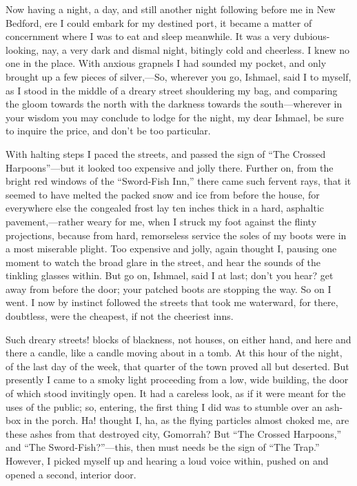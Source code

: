 \documentclass[12pt,ebook,oneside,openany]{memoir} %
\begin{document}
Now having a night, a day, and still another night following before me in New Bedford, ere I could embark for my destined port, it became a matter of concernment where I was to eat and sleep meanwhile. It was a very dubious-looking, nay, a very dark and dismal night, bitingly cold and cheerless. I knew no one in the place. With anxious grapnels I had sounded my pocket, and only brought up a few pieces of silver,—So, wherever you go, Ishmael, said I to myself, as I stood in the middle of a dreary street shouldering my bag, and comparing the gloom towards the north with the darkness towards the south—wherever in your wisdom you may conclude to lodge for the night, my dear Ishmael, be sure to inquire the price, and don’t be too particular.

With halting steps I paced the streets, and passed the sign of “The Crossed Harpoons”—but it looked too expensive and jolly there. Further on, from the bright red windows of the “Sword-Fish Inn,” there came such fervent rays, that it seemed to have melted the packed snow and ice from before the house, for everywhere else the congealed frost lay ten inches thick in a hard, asphaltic pavement,—rather weary for me, when I struck my foot against the flinty projections, because from hard, remorseless service the soles of my boots were in a most miserable plight. Too expensive and jolly, again thought I, pausing one moment to watch the broad glare in the street, and hear the sounds of the tinkling glasses within. But go on, Ishmael, said I at last; don’t you hear? get away from before the door; your patched boots are stopping the way. So on I went. I now by instinct followed the streets that took me waterward, for there, doubtless, were the cheapest, if not the cheeriest inns.

Such dreary streets! blocks of blackness, not houses, on either hand, and here and there a candle, like a candle moving about in a tomb. At this hour of the night, of the last day of the week, that quarter of the town proved all but deserted. But presently I came to a smoky light proceeding from a low, wide building, the door of which stood invitingly open. It had a careless look, as if it were meant for the uses of the public; so, entering, the first thing I did was to stumble over an ash-box in the porch. Ha! thought I, ha, as the flying particles almost choked me, are these ashes from that destroyed city, Gomorrah? But “The Crossed Harpoons,” and “The Sword-Fish?”—this, then must needs be the sign of “The Trap.” However, I picked myself up and hearing a loud voice within, pushed on and opened a second, interior door.
\end{document}
